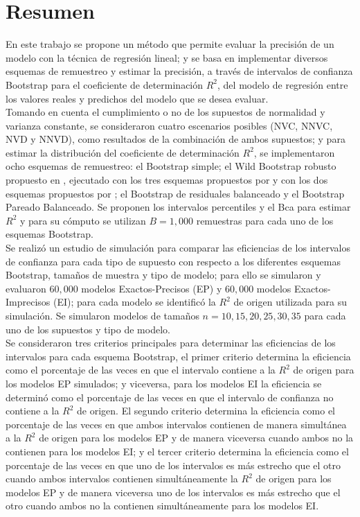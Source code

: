 \section*{Resumen}

En este trabajo se propone un método que permite evaluar la precisión de un modelo con la técnica de regresión lineal; y se basa en implementar diversos esquemas de remuestreo y estimar la precisión, a través de intervalos de confianza Bootstrap para el coeficiente de determinación $R^2$, del modelo de regresión entre los valores reales y predichos del modelo que se desea evaluar.\\

Tomando en cuenta el cumplimiento o no de los supuestos de normalidad y varianza constante, se consideraron cuatro escenarios posibles (NVC, NNVC, NVD y NNVD), como resultados de la combinación de ambos supuestos; y para estimar la distribución del coeficiente de determinación $R^2$, se implementaron ocho esquemas de remuestreo: el Bootstrap simple; el Wild Bootstrap robusto propuesto en \textcite{rana-2012}, ejecutado con los tres esquemas propuestos por \textcite{wu-1986} y con los dos esquemas propuestos por \textcite{liu-1988}; el Bootstrap de residuales balanceado y el Bootstrap Pareado Balanceado. Se proponen los intervalos percentiles y el Bca para estimar $R^2$ y para su cómputo se utilizan $B=1,000$ remuestras para cada uno de los esquemas Bootstrap.\\ 

Se realizó un estudio de simulación para comparar las eficiencias de los intervalos de confianza para cada tipo de supuesto con respecto a los diferentes esquemas Bootstrap, tamaños de muestra y tipo de modelo; para ello se simularon y evaluaron $60,000$ modelos Exactos-Precisos (EP) y $60,000$ modelos Exactos-Imprecisos (EI); para cada modelo se identificó la $R^2$ de origen utilizada para su simulación. Se simularon modelos de tamaños $n=10, 15, 20, 25, 30, 35$ para cada uno de los supuestos y tipo de modelo.\\

Se consideraron tres criterios principales para determinar las eficiencias de los intervalos para cada esquema Bootstrap, el primer criterio determina la eficiencia como el porcentaje de las veces en que el intervalo contiene a la $R^2$ de origen para los modelos EP simulados; y viceversa, para los modelos EI la eficiencia se determinó como el porcentaje de las veces en que el intervalo de confianza no contiene a la $R^2$ de origen. El segundo criterio determina la eficiencia como el porcentaje de las veces en que ambos intervalos contienen de manera simultánea a la $R^2$ de origen para los modelos EP y de manera viceversa cuando ambos no la contienen para los modelos EI; y el tercer criterio determina la eficiencia como el porcentaje de las veces en que uno de los intervalos es más estrecho que el otro cuando ambos intervalos contienen simultáneamente la $R^2$ de origen para los modelos EP y de manera viceversa uno de los intervalos es más estrecho que el otro cuando ambos no la contienen simultáneamente para los modelos EI.\\

